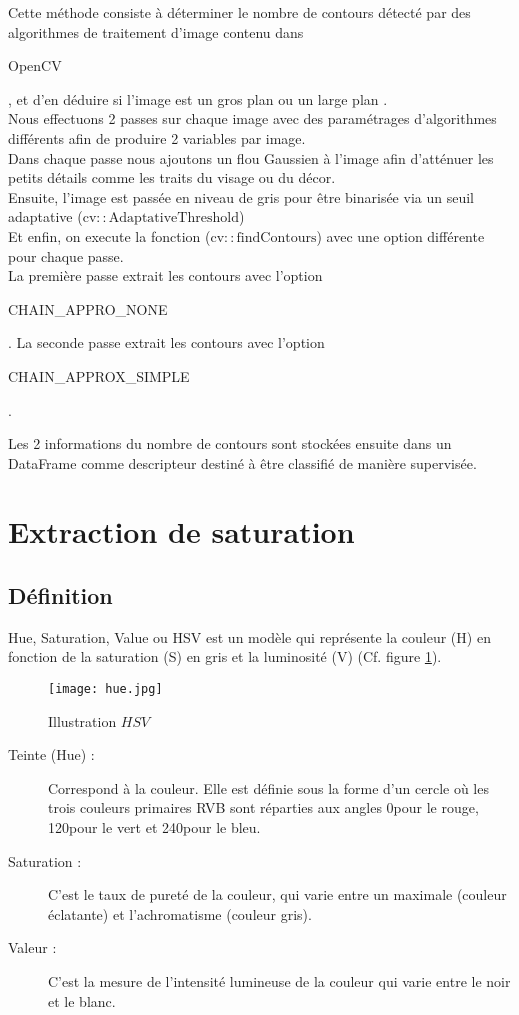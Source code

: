 \documentclass{book}
\begin{document}
Cette méthode consiste à déterminer le nombre de contours détecté par des algorithmes de traitement
d'image contenu dans \begin{itshape}OpenCV\end{itshape}\cite{opencv_library}, et d'en déduire si l'image est un \og gros plan \fg{} ou un \og large plan \fg{}.\\
Nous effectuons 2 passes sur chaque image avec des paramétrages d'algorithmes différents afin de
produire 2 variables par image.\\
Dans chaque passe nous ajoutons un flou Gaussien à l'image afin d'atténuer les petits détails comme les
traits du visage ou du décor.\\
Ensuite, l'image est passée en niveau de gris pour être binarisée via un seuil adaptative ($\mathrm{cv::AdaptativeThreshold}$)\\
Et enfin, on execute la fonction ($\mathrm{cv::findContours}$) avec une option différente pour chaque passe.\\

La première passe extrait les contours avec l'option \begin{itshape}CHAIN\_APPRO\_NONE\end{itshape}. 
La seconde passe extrait les contours avec l'option \begin{itshape}CHAIN\_APPROX\_SIMPLE\end{itshape}. 

Les 2 informations du nombre de contours sont stockées ensuite dans un DataFrame comme descripteur
destiné à être classifié de manière supervisée.

\section{Extraction de saturation}
\subsection{Définition}
Hue, Saturation, Value ou HSV est un modèle qui représente la couleur (H) en fonction de la saturation (S) en gris et la luminosité (V) (Cf. figure \ref{HSV}).
\begin{figure}[H]
\begin{center}
\texttt{[image: hue.jpg]}
\end{center}
\caption{Illustration $HSV$ \cite{wiki:hsv}}
\label{HSV}
\end{figure}
\begin{description}
\item[Teinte (Hue) :] Correspond à la couleur. Elle est définie sous la forme
d'un cercle où les trois couleurs primaires RVB sont
réparties aux angles 0\degre pour le rouge, 120\degre pour le vert
et 240\degre pour le bleu.
\item[Saturation :] C’est le taux de pureté de la couleur, qui varie entre un
maximale (couleur éclatante) et l’achromatisme (couleur
gris).
\item[Valeur :]  C’est la mesure de l’intensité lumineuse de la couleur
qui varie entre le noir et le blanc.
\end{description}
\end{document}
